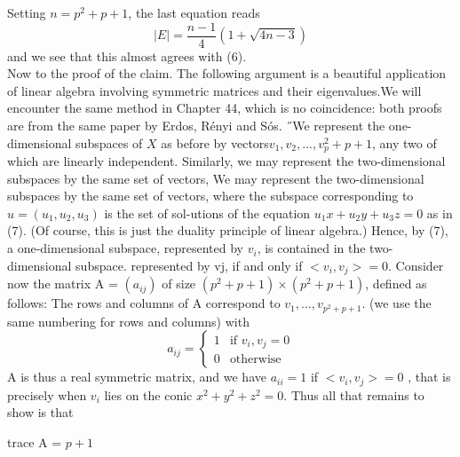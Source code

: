 \documentclass[10pt,twoside]{book}
\begin{document}
		Setting $n = p^2 + p + 1$, the last equation reads
		$$|E| = \frac{n-1}{4}(1+\sqrt{4n-3})$$
		and we see that this almost agrees with (6).\\
		Now to the proof of the claim. The following argument is a beautiful application of linear algebra involving symmetric matrices and their eigenvalues.We will encounter the same method in Chapter 44, which is no coincidence: both proofs are from the same paper by Erdos, Rényi and Sós. ˝We represent the one-dimensional subspaces of $X$ as before by vectors$v_1 , v_2 , . . . , v_p^2+p+1$, any two of which are linearly independent. Similarly, we may represent the two-dimensional subspaces by the same set of vectors, We may represent the two-dimensional subspaces by the same set of vectors, where the subspace corresponding to $u = (u_1, u_2, u_3)$ is the set of sol-utions of the equation $u_1x + u_2y + u_3z = 0$ as in (7). (Of course, this is just the duality principle of linear algebra.) Hence, by (7), a one-dimensional subspace, represented by $v_i$, is contained in the two-dimensional subspace.
		represented by vj, if and only if $<v_i , v_j > = 0.$
		Consider now the matrix A = $(a_{ij})$ of size $(p^2+p+1)\times(p^2+p+1)$, defined as follows: The rows and columns of A correspond to $v_1, \ldots, v_{p^2+p+1}$. (we use the same numbering for rows and columns) with\\
		\[
		a_{ij} = \begin{cases}
			1 & \text{if } v_i, v_j = 0 \\
			0 & \text{otherwise}
		\end{cases}
		\]
		A is thus a real symmetric matrix, and we have $a_{ii}=1$ if $<v_i , v_j> = 0$ , that is precisely when $v_i$ lies on the conic $x^2 + y^2 + z^2 = 0.$ Thus all that   remains to show is that \begin{center}
			trace A = $p+1$
		\end{center}
\end{document}

